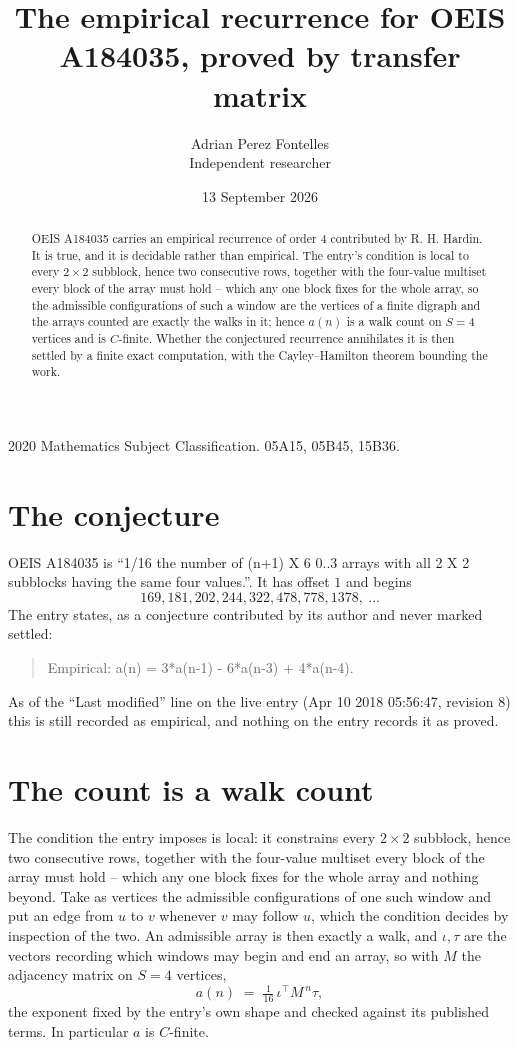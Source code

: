 \documentclass[11pt,a4paper]{article}
\title{The empirical recurrence for OEIS A184035, proved by transfer matrix}
\author{Adrian Perez Fontelles\\ \small Independent researcher}
\date{13 September 2026}
\theoremstyle{plain}
\theoremstyle{definition}
\begin{document}
\maketitle

\begin{abstract}
OEIS A184035 carries an empirical recurrence of order $4$ contributed by R. H. Hardin. It is
true, and it is decidable rather than empirical. The entry's condition is local to every $2\times2$ subblock, hence two consecutive rows, together with the four-value multiset every block of the array must hold -- which any one block fixes for the whole array, so
the admissible configurations of such a window are the vertices of a finite digraph and the
arrays counted are exactly the walks in it; hence $a(n)$ is a walk count on $S=4$ vertices
and is $C$-finite. Whether the conjectured recurrence annihilates it is then settled by a
finite exact computation, with the Cayley--Hamilton theorem bounding the work.
\end{abstract}

\noindent\small 2020 Mathematics Subject Classification. 05A15, 05B45, 15B36.\normalsize

\section{The conjecture}

OEIS A184035 is ``1/16 the number of (n+1) X 6 0..3 arrays with all 2 X 2 subblocks having the same four values.''. It has offset $1$ and begins
\[
169, 181, 202, 244, 322, 478, 778, 1378,\ \dots
\]
The entry states, as a conjecture contributed by its author and never marked settled:
\begin{quote}
Empirical: a(n) = 3*a(n-1) - 6*a(n-3) + 4*a(n-4).
\end{quote}
As of the ``Last modified'' line on the live entry (Apr 10 2018 05:56:47, revision 8) this is still
recorded as empirical, and nothing on the entry records it as proved.

\section{The count is a walk count}

The condition the entry imposes is local: it constrains every $2\times2$ subblock, hence two consecutive rows, together with the four-value multiset every block of the array must hold -- which any one block fixes for the whole array and nothing beyond. Take as vertices the admissible configurations of one such window and put an edge from $u$ to $v$ whenever $v$ may follow $u$, which the condition decides by inspection of the two.
An admissible array is then exactly a walk, and $\iota,\tau$ are the vectors recording which windows may begin and end an array, so with $M$ the adjacency matrix on $S=4$ vertices,
\[
a(n)\;=\;\tfrac{1}{16}\,\iota^{\!\top}M^{\,n}\tau ,
\]
the exponent fixed by the entry's own shape and checked against its published terms. In
particular $a$ is $C$-finite.
\end{document}
